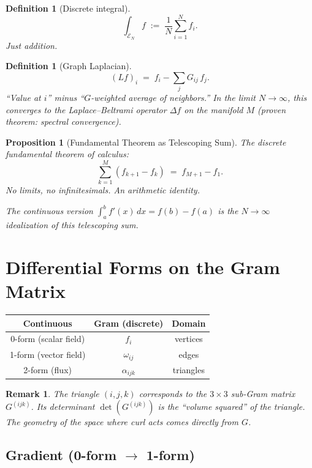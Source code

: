 \documentclass[11pt]{article}
\newtheorem{definition}[theorem]{Definition}
\newtheorem{proposition}[theorem]{Proposition}
\newtheorem{remark}[theorem]{Remark}
\begin{document}
\begin{definition}[Discrete integral]
\[
  \int_{\mathcal{E}_N} f \;:=\;
  \frac{1}{N} \sum_{i=1}^{N} f_i.
\]
Just addition.
\end{definition}

\begin{definition}[Graph Laplacian]
\[
  (Lf)_i \;=\; f_i - \sum_{j} G_{ij}\, f_j.
\]
``Value at $i$'' minus ``$G$-weighted average of neighbors.''
In the limit $N \to \infty$, this converges to the
Laplace--Beltrami operator $\Delta f$ on the manifold $M$
(proven theorem: spectral convergence).
\end{definition}

\begin{proposition}[Fundamental Theorem as Telescoping Sum]
The discrete fundamental theorem of calculus:
\[
  \sum_{k=1}^{M} (f_{k+1} - f_k) \;=\; f_{M+1} - f_1.
\]
No limits, no infinitesimals. An arithmetic identity.

The continuous version $\int_a^b f'(x)\,dx = f(b) - f(a)$
is the $N \to \infty$ idealization of this telescoping sum.
\end{proposition}

\section{Differential Forms on the Gram Matrix}

\begin{center}
\renewcommand{\arraystretch}{1.5}
\begin{tabular}{c|c|c}
\textbf{Continuous} & \textbf{Gram (discrete)} & \textbf{Domain} \\
\hline
0-form (scalar field) & $f_i$ & vertices \\
1-form (vector field) & $\omega_{ij}$ & edges \\
2-form (flux) & $\alpha_{ijk}$ & triangles \\
\end{tabular}
\end{center}

\begin{remark}
The triangle $(i,j,k)$ corresponds to the $3 \times 3$
sub-Gram matrix $G^{(ijk)}$. Its determinant $\det(G^{(ijk)})$
is the ``volume squared'' of the triangle.
The geometry of the space where curl acts comes directly from $G$.
\end{remark}

\subsection{Gradient (0-form $\to$ 1-form)}
\end{document}
